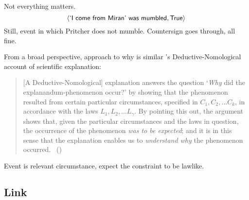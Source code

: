 \begin{note}
  Not everything matters.
  \[
    \pv{\propI{`I come from Miran' was mumbled}}{\valI{True}}
  \]
  Still, event in which Pritcher does not mumble.
  Countersign goes through, all fine.
\end{note}

\begin{note}
  From a broad perspective, approach to why is similar \citeauthor{Hempel:1965aa}'s Deductive-Nomological account of scientific explanation:

  \begin{quote}
    [A Deductive-Nomological] explanation answers the question
    `\emph{Why} did the explanandum-phenomenon occur?'
    by showing that the phenomenon resulted from certain particular circumstances, specified in \(C_{1}, C_{2}, \dots C_{k}\), in accordance with the laws \(L_{1}, L_{2}, \dots L_{\gamma}\).
    By pointing this out, the argument shows that, given the particular circumstances and the laws in question, the occurrence of the phenomenon \emph{was to be expected}; and it is in this sense that the explanation enables us to \emph{understand why} the phenomenon occurred.%
    \mbox{ }\hfill\mbox{(\citeyear[337]{Hempel:1965aa})}
  \end{quote}

  Event is relevant circumstance, expect the constraint to be lawlike.
\end{note}

\subsection{Link}
\label{cha:var:qwhyvnp:link}

